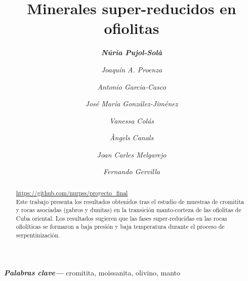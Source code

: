 \documentclass[a4paper,11pt]{article}
\providecommand{\keywords}[1]{\textbf{\textit{Palabras clave---}} #1}
\begin{document}
	\title {\bf Minerales super-reducidos en ofiolitas}
	\author[1]{\sl \bf Núria Pujol-Solà}
	\author[1]{\sl Joaquín A. Proenza}
	\author[2,3]{\sl Antonio Garcia-Casco}
	\author[2]{\sl José María González-Jiménez}
	\author[4]{\sl Vanessa Colás}
	\author[1]{\sl Àngels Canals}
	\author[1]{\sl Joan Carles Melgarejo}
	\author[2,3]{\sl Fernando Gervilla} 
	\renewcommand\Authands{ y }
	\date{}
	\maketitle
	\begin{abstract}
	\href{https://github.com/nurpss/proyecto_final}{https://github.com/nurpss/proyecto\_final}
	\\Este trabajo presenta los resultados obtenidos tras el estudio de muestras de cromitita y rocas asociadas (gabros y dunitas) en la transición manto-corteza de las ofiolitas de Cuba oriental. Los resultados sugieren que las fases super-reducidas en las rocas ofiolíticas se formaron a baja presión y baja temperatura durante el proceso de serpentinización.
	\end{abstract}
	\keywords{cromitita, moissanita, olivino, manto}
\end{document}
